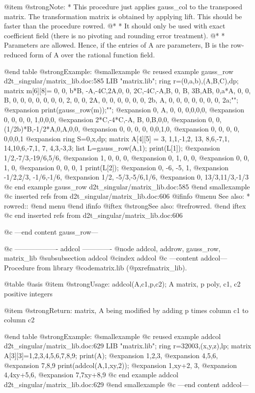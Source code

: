 @item @strong{Note:}
* This procedure just applies gauss_col to the transposed matrix.
The transformation matrix is obtained by applying lift.
This should be faster than the procedure rowred.
@* * It should only be used with exact coefficient field (there is no
pivoting and rounding error treatment).
@* * Parameters are allowed. Hence, if the entries of A are parameters,
B is the row-reduced form of A over the rational function field.

@end table
@strong{Example:}
@smallexample
@c reused example gauss_row d2t_singular/matrix_lib.doc:585 
LIB "matrix.lib";
ring r=(0,a,b),(A,B,C),dp;
matrix m[6][8]=
0, 0,  b*B, -A,-4C,2A,0, 0,
2C,-4C,-A,B, 0,  B, 3B,AB,
0,a*A,  0, 0, B,  0, 0, 0,
0, 0,  0, 0, 2,  0, 0, 2A,
0, 0,  0, 0, 0,  0, 2b, A,
0, 0,  0, 0, 0,  0, 0, 2a;"";
@expansion{} 
print(gauss_row(m));"";
@expansion{} 0,  A,   0,       0,     0,0,0,0,
@expansion{} 0,  0,   0,       0,     1,0,0,0,
@expansion{} 2*C,-4*C,-A,      B,     0,B,0,0,
@expansion{} 0,  0,   (1/2b)*B,-1/2*A,0,A,0,0,
@expansion{} 0,  0,   0,       0,     0,0,1,0,
@expansion{} 0,  0,   0,       0,     0,0,0,1 
@expansion{} 
ring S=0,x,dp;
matrix A[4][5] =  3, 1,1,-1,2,
13, 8,6,-7,1,
14,10,6,-7,1,
7, 4,3,-3,3;
list L=gauss_row(A,1);
print(L[1]);
@expansion{} 1/2,-7/3,-19/6,5/6,
@expansion{} 1,  0,   0,    0,  
@expansion{} 0,  1,   0,    0,  
@expansion{} 0,  0,   1,    0,  
@expansion{} 0,  0,   0,    1   
print(L[2]);
@expansion{} 0,   -6,  -5,  1,   
@expansion{} -1/2,2/3, -1/6,-1/6,
@expansion{} 1/2, -5/3,-5/6,1/6, 
@expansion{} 0,   13/3,11/3,-1/3 
@c end example gauss_row d2t_singular/matrix_lib.doc:585
@end smallexample
@c inserted refs from d2t_singular/matrix_lib.doc:606
@ifinfo
@menu
See also:
* rowred::
@end menu
@end ifinfo
@iftex
@strong{See also:}
@ref{rowred}.
@end iftex
@c end inserted refs from d2t_singular/matrix_lib.doc:606

@c ---end content gauss_row---

@c ------------------- addcol -------------
@node addcol, addrow, gauss_row, matrix_lib
@subsubsection addcol
@cindex addcol
@c ---content addcol---
Procedure from library @code{matrix.lib} (@pxref{matrix_lib}).

@table @asis
@item @strong{Usage:}
addcol(A,c1,p,c2); A matrix, p poly, c1, c2 positive integers

@item @strong{Return:}
matrix, A being modified by adding p times column c1 to column c2

@end table
@strong{Example:}
@smallexample
@c reused example addcol d2t_singular/matrix_lib.doc:629 
LIB "matrix.lib";
ring r=32003,(x,y,z),lp;
matrix A[3][3]=1,2,3,4,5,6,7,8,9;
print(A);
@expansion{} 1,2,3,
@expansion{} 4,5,6,
@expansion{} 7,8,9 
print(addcol(A,1,xy,2));
@expansion{} 1,xy+2, 3,
@expansion{} 4,4xy+5,6,
@expansion{} 7,7xy+8,9 
@c end example addcol d2t_singular/matrix_lib.doc:629
@end smallexample
@c ---end content addcol---

